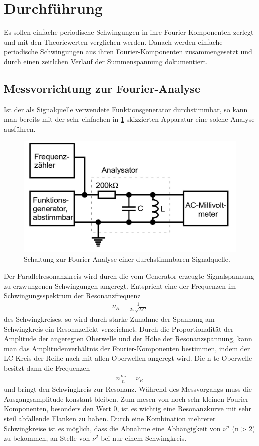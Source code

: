 \section{Durchführung}
\label{sec:Durchführung}

Es sollen einfache periodische Schwingungen in ihre Fourier-Komponenten zerlegt und mit den Theoriewerten verglichen werden.
Danach werden einfache periodische Schwingungen aus ihren Fourier-Komponenten zusammengesetzt und durch einen zeitlchen Verlauf der Summenspannung dokumentiert.

\subsection{Messvorrichtung zur Fourier-Analyse}
\label{sec:Analyse}
Ist der als Signalquelle verwendete Funktionsgenerator durchstimmbar, so kann man bereits mit der sehr einfachen in \ref{fig:abb2} skizzierten Apparatur eine solche Analyse ausführen.
\begin{figure}
  \centering
  \includegraphics[width=\textwidth]{abb2.jpg}
  \caption{Schaltung zur Fourier-Analyse einer durchstimmbaren Signalquelle.}
  \label{fig:abb2}
\end{figure}
Der Parallelresonanzkreis wird durch die vom Generator erzeugte Signalspannung zu erzwungenen Schwingungen angeregt.
Entspricht eine der Frequenzen im Schwingungsspektrum der Resonanzfrequenz
\begin{align}
  \nu_R = \frac{1}{2 \pi \sqrt{L C}}
\end{align}
des Schwingkreises, so wird durch starke Zunahme der Spannung am Schwingkreis ein Resonnzeffekt verzeichnet.
Durch die Proportionalität der Amplitude der angeregten Oberwelle und der Höhe der Resonanzspannung, kann man das Amplitudenverhältnis der Fourier-Komponenten bestimmen,
indem der LC-Kreis der Reihe nach mit allen Oberwellen angeregt wird.
Die n-te Oberwelle besitzt dann die Frequenzen
\begin{align}
  n \frac{\nu_R}{n} = \nu_R
\end{align}
und bringt den Schwingkreis zur Resonanz.
Während des Messvorgangs muss die Ausgangsamplitude konstant bleiben.
Zum mesen von noch sehr kleinen Fourier-Komponenten, besonders den Wert 0, ist es wichtig eine Resonanzkurve mit sehr steil abfallende Flanken zu haben.
Durch eine Kombination mehrerer Schwingkreise ist es möglich, dass die Abnahme eine Abhängigkeit von $\nu^n$ (n > 2) zu bekommen, an Stelle von $\nu^2$ bei nur einem Schwingkreis.

